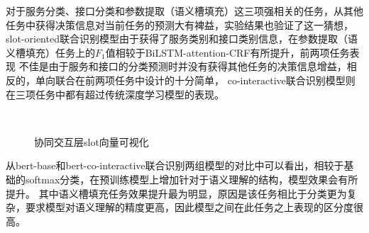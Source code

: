 对于服务分类、接口分类和参数提取（语义槽填充）这三项强相关的任务，从其他任务中获得决策信息对当前任务的预测大有裨益，实验结果也验证了这一猜想，
slot-oriented联合识别模型由于获得了服务类别和接口类别信息，在参数提取（语义槽填充）任务上的$F_1$值相较于BiLSTM-attention-CRF有所提升，前两项任务表现
不佳是由于服务和接口的分类预测时并没有获得其他任务的决策信息增益，相反的，单向联合在前两项任务中设计的十分简单，
co-interactive联合识别模型则在三项任务中都有超过传统深度学习模型的表现。
\begin{figure}[htbp]
   \centering
  \\
    \centering
  \caption{协同交互层slot向量可视化}
  \label{fig:visual}
  \end{figure}
从bert-base和bert-co-interactive联合识别两组模型的对比中可以看出，相较于基础的softmax分类，在预训练模型上增加针对于语义理解的结构，模型效果会有所提升。
其中语义槽填充任务效果提升最为明显，原因是该任务相比于分类更为复杂，要求模型对语义理解的精度更高，因此模型之间在此任务之上表现的区分度很高。

